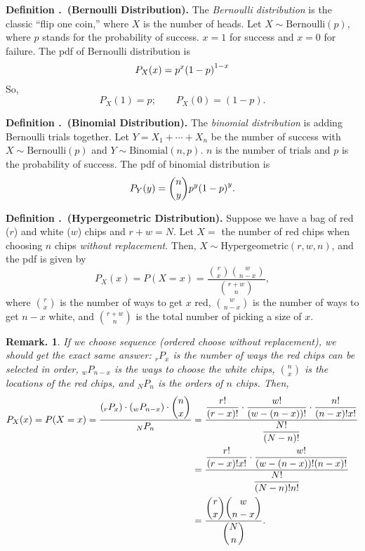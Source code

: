 \documentclass[12pt, a4paper]{article}
\newcounter{index}[subsection]
\newenvironment*{df}[1]{\par\noindent\textbf{Definition \thesubsection.\stepcounter{index}\theindex\ (#1).}}{\par}
\newtheorem*{rmk}{Remark.}
\def\dsst{\displaystyle}
\newcommand\perm[2][n]{_{#1}P_{#2}}
\begin{document}
\begin{df}{Bernoulli Distribution}
	The \textit{Bernoulli distribution} is the classic ``flip one coin,'' where $X$ is the number of heads. Let $X\sim\text{Bernoulli}(p)$, where $p$ stands for the probability of success. $x=1$ for success and $x=0$ for failure. The pdf of Bernoulli distribution is \[P_X(x)=p^x\qty(1-p)^{1-x}\] So, \[P_X(1)=p;\qquad P_X(0)=(1-p).\]
\end{df}
\begin{df}{Binomial Distribution}
	The \textit{binomial distribution} is adding Bernoulli trials together. Let $Y=X_1+\cdots+X_n$ be the number  of success with $X\sim\text{Bernoulli}(p)$ and $Y\sim\text{Binomial}(n,p)$. $n$ is the number of trials and $p$ is the probability of success. The pdf of binomial distribution is \[P_Y(y)=\binom{n}{y}p^y\qty(1-p)^y.\]
\end{df}
\begin{df}{Hypergeometric Distribution}
	Suppose we have a bag of red ($r$)	 and white ($w$) chips and $r+w=N$. Let $X=$ the number of red chips when choosing $n$ chips \textit{without replacement}. Then, $X\sim\text{Hypergeometric}(r,w,n)$, and the pdf is given by \[P_X(x)=P(X=x)=\dfrac{\dsst\binom{r}{x}\binom{w}{n-x}}{\dsst\binom{r+w}{n}},\] where $\dsst\binom{r}{x}$ is the number of ways to get $x$ red, $\dsst\binom{w}{n-x}$ is the number of ways to get $n-x$ white, and $\dsst\binom{r+w}{n}$ is the total number of picking a size of $x$.
\end{df}
\begin{rmk}
	If we choose sequence (ordered choose without replacement), we should get the exact same answer: $\perm[r]{x}$ is the number of ways the red chips can be selected in order, $\perm[w]{n-x}$ is the ways to choose the white chips, $\dsst\binom{n}{x}$ is the locations of the red chips, and $\perm[N]{n}$ is the orders of $n$ chips. Then, 
	\begin{align*}
		P_X(x)=P(X=x)=\dfrac{\qty(\perm[r]{x})\cdot\qty(\perm[w]{n-x})\cdot\dsst\binom{n}{x}}{\perm[N]{n}}&=\dfrac{\dfrac{r!}{(r-x)!}\cdot\dfrac{w!}{(w-(n-x))!}\cdot\dfrac{n!}{(n-x)!x!}}{\dfrac{N!}{(N-n)!}}\\
		&=\dfrac{\dfrac{r!}{(r-x)!x!}\cdot\dfrac{w!}{(w-(n-x))!(n-x)!}}{\dfrac{N!}{(N-n)!n!}}\\&=\dfrac{\dsst\binom{r}{x}\binom{w}{n-x}}{\dsst\binom{N}{n}}.
	\end{align*}
\end{rmk}
\end{document}
